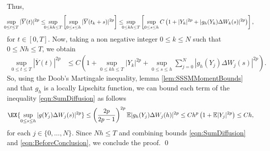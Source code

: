 \documentclass[sort&compress, preprint]{elsarticle}
\theoremstyle{definition}
\theoremstyle{plain}%
\theoremstyle{remark}
\newcommand{\m}[1]{\mathbb{E}#1}
\begin{document}
	Thus, 
	\begin{equation}
		\hspace{-0.2cm}\sup_{0\leq t\leq T} |\overline{Y}(t)|^{2p}
		\leq
			\hspace{-0.2cm}\sup_{0\leq kh\leq T}
			\left[
				\sup_{0\leq s\leq h}
					|\overline{Y}(t_k+s)|^{2p} 
			\right] 
		\leq
			\hspace{-0.2cm}\sup_{0\leq kh\leq T} 
			\left[
				\sup_{0\leq s\leq h}
					C 
					\left(
						1 + |Y_k|^{2p} + |g_h(Y_k)\Delta W_k(s)|^{2p}
					\right)
			\right],
		\label{eqn:BeforeDoob}
	\end{equation}
	for $t\in [0,T]$.
	Now, taking a non negative integer $0 \leq k \leq N$ such that $0\leq Nh \leq T$, we obtain
	\begin{align}
		\sup_{0\leq t\leq T} |\overline{Y}(t)|^{2p}
		&\leq 
			C
			\left(
				1
				+
				\sup_{0\leq kh\leq T} 
					|Y_k|^{2p}
					+
					\sup_{0\leq s\leq h}
						\sum_{j=0}^N
							|g_h(Y_j)\Delta W_j(s)|^{2p}
			\right) \label{eqn:SumDiffusion}.
	\end{align}
	So, using the Doob's Martingale inequality, lemma
	\ref{lem:SSSMMomentBounds} and that $g_h$ is a locally 
	Lipschitz function, we can bound each term of the inequality \eqref{eqn:SumDiffusion}
	as follows
	\begin{align}
		\EX{
			\sup_{0 \leq s \leq h} |g(Y_j) \Delta W_j(s)|^{2p}
		}
		\leq
			\left(
				\frac{2p}{2p-1}
			\right)^{2p}
			\m|g_h(Y_j)\Delta W_j(h)|^{2p}
		\leq
			C h^p
			\left(
				1 + \m|Y_j|^{2p}
			\right)
		 \leq C h, \label{eqn:BeforeConclusion}
	\end{align}
	for each $j \in \{0,\dots, N\}$.
	Since $Nh\leq T$ and combining bounds \eqref{eqn:SumDiffusion} 
	and \eqref{eqn:BeforeConclusion}, we conclude the proof. \qed
\end{document}
